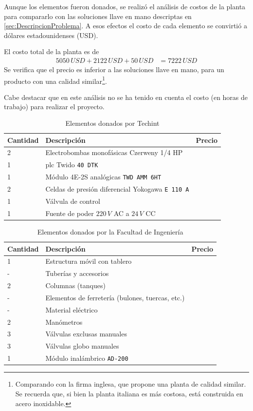 Aunque los elementos fueron donados, se realizó el análisis de costos de la
planta para compararlo con las soluciones llave en mano descriptas en
\ref{sec:DescripcionProblema}.
A esos efectos el costo de cada elemento se convirtió a dólares
estadounidenses (USD).

El costo total de la planta es de
\begin{align}
5050\,USD + 2122\,USD + 50\,USD &= 7222\,USD
\end{align}
Se verifica que el precio es inferior a las soluciones llave en mano, para un
producto con una calidad similar\footnote{Comparando con la firma inglesa,
que propone una planta de calidad similar. Se recuerda que, si bien la planta
italiana es más costosa, está construida en acero inoxidable.}.

Cabe destacar que en este análisis no se ha tenido en cuenta el costo (en
horas de trabajo) para realizar el proyecto.
\begin{table}[!t]
\renewcommand{\arraystretch}{1.4}
\centering
\begin{tabularx}{\textwidth}{l||X||l}
\hline
\bfseries Cantidad & \bfseries Descripción &\bfseries Precio\\
\hline \hline
2& Electrobombas monofásicas Czerweny 1/4 HP &
 {\multirow{6}{*}{5050 USD}}\\
1& \gls{plc} Twido \texttt{40 DTK} &  \\
1& Módulo 4E-2S analógicas \texttt{TWD AMM 6HT}& \\
2& Celdas de presión diferencial Yokogawa \texttt{E 110 A}& \\
1& Válvula de control & \\
1& Fuente de poder $220\,V$ AC a $24\,V$ CC& \\
\hline
\end{tabularx}
\caption{Elementos donados por Techint}
\label{tab:donacionTechint}
\end{table}

\begin{table}[!t]
\renewcommand{\arraystretch}{1.4}
\centering
\begin{tabularx}{\textwidth}{l||X||l}
\hline
\bfseries Cantidad & \bfseries Descripción & \bfseries Precio\\
\hline \hline
1& Estructura móvil con tablero&
 {\multirow{9}{*}{2122 USD}}\\
-& Tuberías y accesorios &  \\
2& Columnas (tanques) &  \\
-& Elementos de ferretería (bulones, tuercas, etc.)& \\
-& Material eléctrico &\\
2& Manómetros& \\
3& Válvulas exclusas manuales& \\
3& Válvulas globo manuales& \\
1& Módulo inalámbrico \texttt{AD-200}&\\
\hline
\end{tabularx}
\caption{Elementos donados por la Facultad de Ingeniería}
\label{tab:donacionFing}
\end{table}

